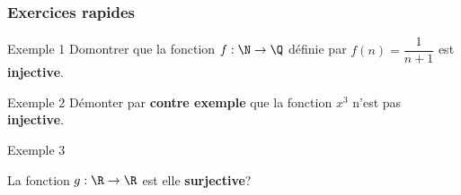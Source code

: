 \begin{frame}[t]
  \frametitle{Exercices rapides}
 \begin{block}{Exemple 1}
   Domontrer que la fonction $f: \N\rightarrow \Q$ définie par $f(n) =
   \dfrac{1}{n+1}$ est \textbf{injective}. 
 \end{block} 
 \begin{block}{Exemple 2}
   Démonter par \textbf{\alert{contre exemple}}  que la fonction $x^3$ n'est pas
   \textbf{injective}.
 \end{block}

 \begin{block}{Exemple 3}
   
   La fonction $g:\R\rightarrow\R$ est elle \textbf{\alert{surjective}}?
 \end{block}
\end{frame}
